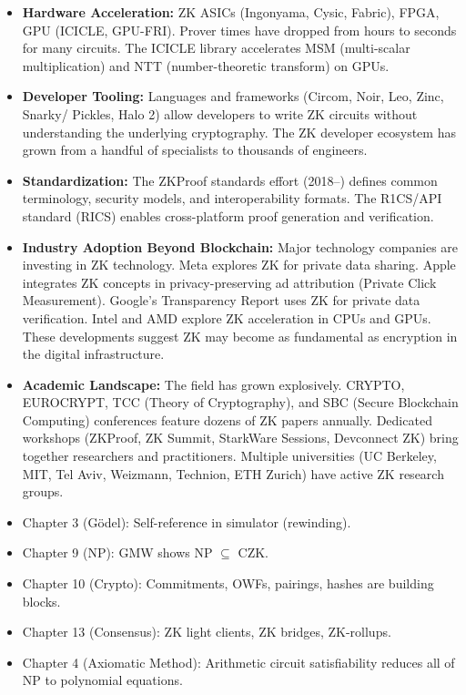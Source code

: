 \begin{itemize}
\item \textbf{Hardware Acceleration:} ZK ASICs (Ingonyama, Cysic, Fabric), FPGA, GPU (ICICLE, GPU-FRI). Prover times have dropped from hours to seconds for many circuits. The ICICLE library accelerates MSM (multi-scalar multiplication) and NTT (number-theoretic transform) on GPUs.

\item \textbf{Developer Tooling:} Languages and frameworks (Circom, Noir, Leo, Zinc, Snarky/ Pickles, Halo 2) allow developers to write ZK circuits without understanding the underlying cryptography. The ZK developer ecosystem has grown from a handful of specialists to thousands of engineers.

\item \textbf{Standardization:} The ZKProof standards effort (2018--) defines common terminology, security models, and interoperability formats. The R1CS/API standard (RICS) enables cross-platform proof generation and verification.

\item \textbf{Industry Adoption Beyond Blockchain:} Major technology companies are investing in ZK technology. Meta explores ZK for private data sharing. Apple integrates ZK concepts in privacy-preserving ad attribution (Private Click Measurement). Google's Transparency Report uses ZK for private data verification. Intel and AMD explore ZK acceleration in CPUs and GPUs. These developments suggest ZK may become as fundamental as encryption in the digital infrastructure.

\item \textbf{Academic Landscape:} The field has grown explosively. CRYPTO, EUROCRYPT, TCC (Theory of Cryptography), and SBC (Secure Blockchain Computing) conferences feature dozens of ZK papers annually. Dedicated workshops (ZKProof, ZK Summit, StarkWare Sessions, Devconnect ZK) bring together researchers and practitioners. Multiple universities (UC Berkeley, MIT, Tel Aviv, Weizmann, Technion, ETH Zurich) have active ZK research groups.
\end{itemize}

\begin{itemize}
\item Chapter 3 (G\"odel): Self-reference in simulator (rewinding).
\item Chapter 9 (NP): GMW shows NP $\subseteq$ CZK.
\item Chapter 10 (Crypto): Commitments, OWFs, pairings, hashes are building blocks.
\item Chapter 13 (Consensus): ZK light clients, ZK bridges, ZK-rollups.
\item Chapter 4 (Axiomatic Method): Arithmetic circuit satisfiability reduces all of NP to polynomial equations.
\end{itemize}

